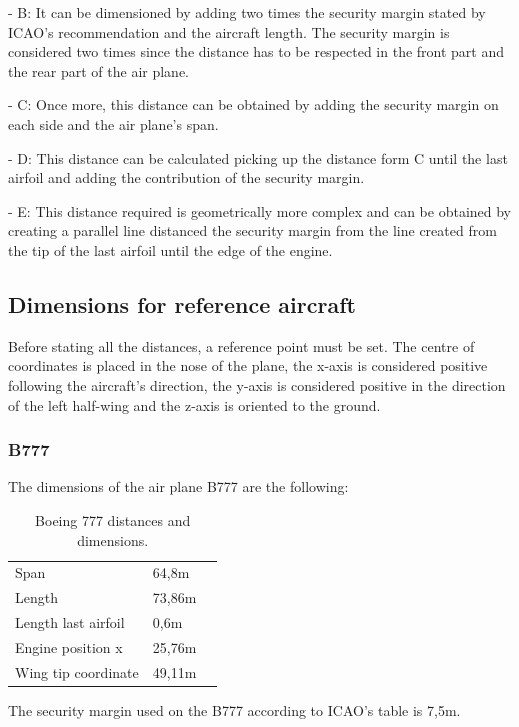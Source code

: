 		- B: It can be dimensioned by adding two times the security margin stated by ICAO's recommendation and the aircraft length. The security margin is considered two times since the distance has to be respected in the front part and the rear part of the air plane.
		
		- C: Once more, this distance can be obtained by adding the security margin on each side and the air plane's span. 
		
		- D: This distance can be calculated picking up the distance form C until the last airfoil and adding the contribution of the security margin.
		
		- E: This distance required is geometrically more complex and can be obtained by creating a parallel line distanced the security margin from the line created from the tip of the last airfoil until the edge of the engine.   
		
		\subsection{Dimensions for reference aircraft}
		Before stating all the distances, a reference point must be set. The centre of coordinates is placed in the nose of the plane, the x-axis is considered positive following the aircraft's direction, the y-axis is considered positive in the direction of the left half-wing and the z-axis is oriented to the ground.  
		
		\subsubsection{B777}
		The dimensions of the air plane B777 are the following:
		
		\begin{table}[htb]
			\centering
			\begin{tabular}{ll p{5cm}}
				\midrule[2pt]
				Span & 64,8m\\
				Length & 73,86m\\
				Length last airfoil& 0,6m \\
				Engine position x & 25,76m\\
				Wing tip coordinate & 49,11m\\
				\bottomrule[2pt]
			\end{tabular}
			\caption{Boeing 777 distances and dimensions.}
			\label{Boeingdistances}
		\end{table}
		
		The security margin used on the B777 according to ICAO's table is 7,5m.
		
